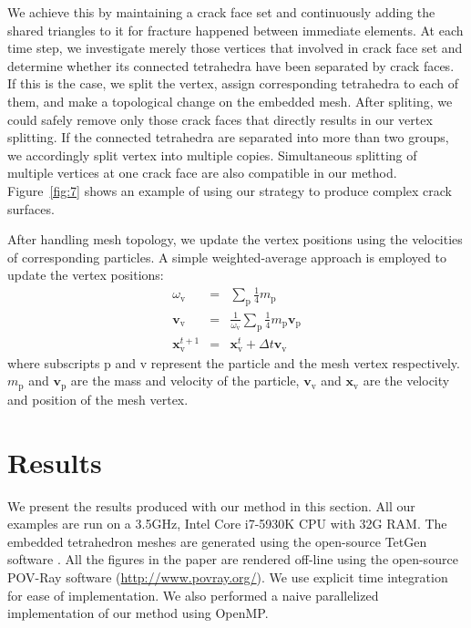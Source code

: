 We achieve this by maintaining a crack face set and continuously adding the shared triangles to it for fracture happened between immediate elements.
At each time step, we investigate merely those vertices that involved in crack face set and determine whether its connected tetrahedra have been separated by crack faces.
If this is the case, we split the vertex, assign corresponding tetrahedra to each of them, and make a topological change on the embedded mesh.
After spliting, we could safely remove only those crack faces that directly results in our vertex splitting.
If the connected tetrahedra are separated into more than two groups, we accordingly split vertex into multiple copies.
Simultaneous splitting of multiple vertices at one crack face are also compatible in our method.
Figure~\ref{fig:7} shows an example of using our strategy to produce complex crack surfaces.

After handling mesh topology, we update the vertex positions using the velocities of corresponding particles.
A simple weighted-average approach is employed to update the vertex positions:
\begin{eqnarray}
\omega_{\mathrm{v}} &=& \sum_{\mathrm{p}} \frac{1}{4}m_{\mathrm{p}}\\
\textbf{v}_{\mathrm{v}} &=& \frac{1}{\omega_{\mathrm{v}}}\sum_{\mathrm{p}}\frac{1}{4}m_{\mathrm{p}}\textbf{v}_{\mathrm{p}}\\
\mathbf{x}_{\mathrm{v}}^{t+1} &=& \mathbf{x}_{\mathrm{v}}^{t} + \Delta t\textbf{v}_{\mathrm{v}}
\end{eqnarray}
where subscripts $\mathrm{p}$ and $\mathrm{v}$ represent the particle and the mesh vertex respectively.
$m_{\mathrm{p}}$ and $\textbf{v}_{\mathrm{p}}$ are the mass and velocity of the particle, $\textbf{v}_{\mathrm{v}}$ and $\textbf{x}_{\mathrm{v}}$ are the velocity and position of the mesh vertex.

\section{Results}

We present the results produced with our method in this section. All our examples are run on a 3.5GHz, Intel Core i7-5930K CPU with 32G RAM. The embedded tetrahedron meshes are generated using the open-source TetGen software \cite{Si:2015:TDQ:2732672.2629697}. All the figures in the paper are rendered off-line using the open-source POV-Ray software (\url{http://www.povray.org/}). We use explicit time integration for ease of implementation. We also performed a naive parallelized implementation of our method using OpenMP.

